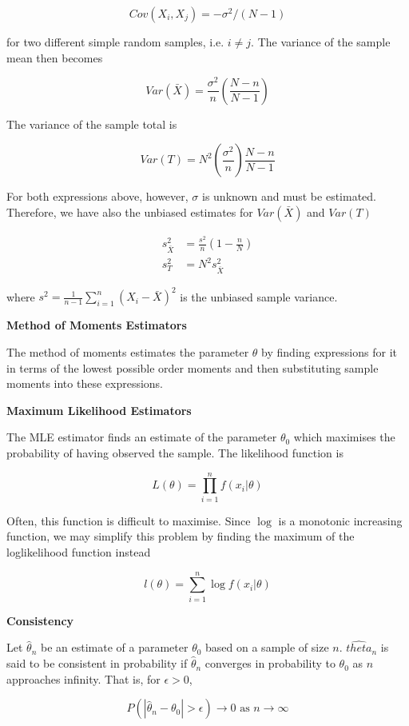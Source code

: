 \documentclass[a4paper]{article}
\newcommand{\subheading}[1]{{\scriptsize\textbf{#1}}}
\begin{document}
\begin{multicols*}{4}
$$Cov(X_i, X_j) = -\sigma^2 / (N-1)$$

for two different simple random samples, i.e. $i \neq j$. The variance of the
sample mean then becomes

$$Var(\bar{X}) = \frac{\sigma^2}{n} \left ( \frac{N - n}{N - 1} \right )$$

The variance of the sample total is

$$Var(T) = N^2 \left ( \frac{\sigma^2}{n} \right ) \frac{N- n}{N-1}$$

For both expressions above, however, $\sigma$ is unknown and must be estimated.
Therefore, we have also the unbiased estimates for $Var(\bar{X})$ and $Var(T)$

\begin{align*}
  s^2_{\bar{X}} &= \frac{s^2}{n} \left ( 1 - \frac{n}{N} \right ) \\
  s^2_T &= N^2 s^2_{\bar{X}}
\end{align*}

where $s^2 = \frac{1}{n-1}\sum^n_{i=1}(X_i - \bar{X})^2$ is the unbiased sample
variance. \smallskip

\subheading{Method of Moments Estimators}

The method of moments estimates the parameter $\theta$ by finding expressions
for it in terms of the lowest possible order moments and then substituting
sample moments into these expressions. \smallskip

\subheading{Maximum Likelihood Estimators}

The MLE estimator finds an estimate of the parameter $\theta_0$ which maximises
the probability of having observed the sample. The likelihood function is

$$L(\theta) = \prod^n_{i=1} f(x_i|\theta)$$

Often, this function is difficult to maximise. Since $\log$ is a monotonic
increasing function, we may simplify this problem by finding the maximum of the
loglikelihood function instead

$$l(\theta) = \sum^n_{i=1} \log f(x_i|\theta)$$

\subheading{Consistency}

Let $\hat{\theta}_n$ be an estimate of a parameter $\theta_0$ based on a sample
of size $n$. $\hat{theta}_n$ is said to be consistent in probability if
$\hat{\theta}_n$ converges in probability to $\theta_0$ as $n$ approaches
infinity. That is, for $\epsilon > 0$,

$$P(|\hat{\theta}_n - \theta_0| > \epsilon) \rightarrow 0 \text{ as } n
\rightarrow \infty$$


\end{multicols*}
\end{document}
